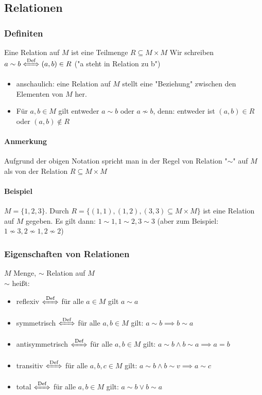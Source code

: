 \documentclass[a4paper]{scrartcl}
\theoremstyle{definition}
\theoremstyle{plain}
\theoremstyle{plain}
\theoremstyle{remark}
\theoremstyle{remark}
\theoremstyle{remark}
\theoremstyle{remark}
\theoremstyle{remark}
\begin{document}
\subsection{Relationen}
\label{sec-2-5}
\subsubsection{Definiten}
\label{sec-2-5-1}
Eine Relation auf $M$ ist eine Teilmenge $R\subseteq M\times M$
Wir schreiben $a\sim b \xLeftrightarrow{\text{Def}} (a,b) \in R$ ("a steht in Relation zu b")

\begin{itemize}
\item anschaulich: eine Relation auf $M$ stellt eine "Beziehung" zwischen den Elementen von $M$ her.
\item Für $a,b \in M$ gilt entweder $a\sim b$ oder $a\not\sim b$, denn: entweder ist $(a,b) \in R$ oder $(a,b)\not\in R$
\end{itemize}
\paragraph{Anmerkung}
\label{sec-2-5-1-1}
Aufgrund der obigen Notation spricht man in der Regel von Relation "$\sim$" auf $M$ als von der Relation $R \subseteq M\times M$
\paragraph{Beispiel}
\label{sec-2-5-1-2}
$M = \{1,2,3\}$. Durch $R = \{(1,1), (1,2), (3,3) \subseteq M\times M\}$ ist eine Relation auf $M$ gegeben. Es gilt dann: $1\sim 1, 1\sim 2, 3\sim 3$ (aber zum Beispiel: $1\not\sim 3, 2\not\sim 1, 2\not\sim 2$)

\subsubsection{Eigenschaften von Relationen}
\label{sec-2-5-2}
$M$ Menge, $\sim$ Relation auf $M$ \\
    $\sim$ heißt:
\begin{itemize}
\item reflexiv $\xLeftrightarrow{\text{Def}}$ für alle $a\in M$ gilt $a\sim a$
\item symmetrisch $\xLeftrightarrow{\text{Def}}$ für alle $a,b\in M$ gilt: $a\sim b \implies b\sim a$
\item antisymmetrisch $\xLeftrightarrow{\text{Def}}$ für alle $a,b \in M$ gilt: $a\sim b \wedge b\sim a \implies a = b$
\item transitiv $\xLeftrightarrow{\text{Def}}$ für alle $a,b,c\in M$ gilt: $a\sim b \wedge b\sim v \implies a\sim c$
\item total $\xLeftrightarrow{\text{Def}}$ für alle $a,b\in M$ gilt: $a\sim b \vee b\sim a$
\end{itemize}
\end{document}
